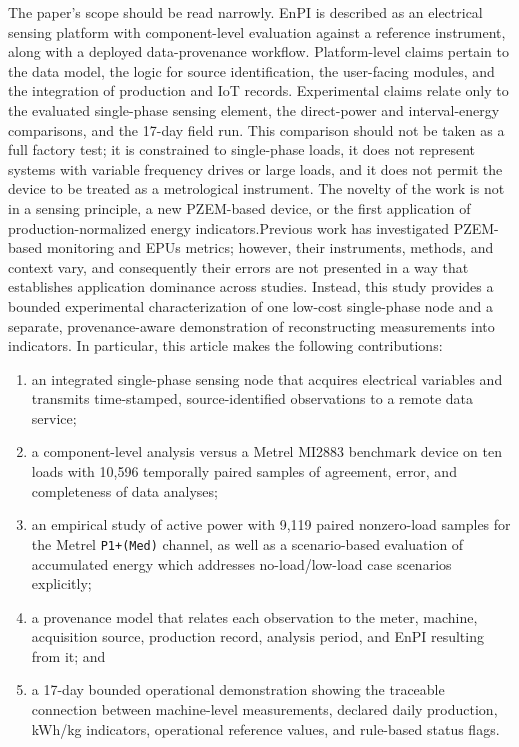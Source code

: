 \documentclass[technologies,article,submit,pdftex,moreauthors]{Definitions/mdpi}
\begin{document}
The paper's scope should be read narrowly. EnPI is described as an electrical sensing platform with component-level evaluation against a reference instrument, along with a deployed data-provenance workflow. Platform-level claims pertain to the data model, the logic for source identification, the user-facing modules, and the integration of production and IoT records. Experimental claims relate only to the evaluated single-phase sensing element, the direct-power and interval-energy comparisons, and the 17-day field run.
This comparison should not be taken as a full factory test; it is constrained to single-phase loads, it does not represent systems with variable frequency drives or large loads, and it does not permit the device to be treated as a metrological instrument.
The novelty of the work is not in a sensing principle, a new PZEM-based device, or the first application of production-normalized energy indicators.Previous work has investigated PZEM-based monitoring and EPUs metrics; however, their instruments, methods, and context vary, and consequently their errors are not presented in a way that establishes application dominance across studies. Instead, this study provides a bounded experimental characterization of one low-cost single-phase node and a separate, provenance-aware demonstration of reconstructing measurements into indicators. In particular, this article makes the following contributions:
\begin{enumerate}
\item an integrated single-phase sensing node that acquires electrical variables and transmits time-stamped, source-identified observations to a remote data service;
\item a component-level analysis versus a Metrel MI2883 benchmark device on ten loads with 10,596 temporally paired samples of agreement, error, and completeness of data analyses;
\item an empirical study of active power with 9,119 paired nonzero-load samples for the Metrel \texttt{P1+(Med)} channel, as well as a scenario-based evaluation of accumulated energy which addresses no-load/low-load case scenarios explicitly;
\item a provenance model that relates each observation to the meter, machine, acquisition source, production record, analysis period, and EnPI resulting from it; and
\item a 17-day bounded operational demonstration showing the traceable connection between machine-level measurements, declared daily production, kWh/kg indicators, operational reference values, and rule-based status flags.
\end{enumerate}
\end{document}
